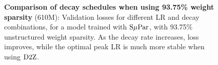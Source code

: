 \begin{figure}
  \centering
  \scalebox{\onefigscale}{
    \texttt{[image: pdffigs/s=0.9375\_curves.617M.pdf]}
  }
  \mbox{}
  \vspace{-4mm}
  \mbox{}
  \caption{\textbf{Comparison of decay schedules when using 93.75\%
      weight sparsity} (610M): Validation losses for different LR and
    decay combinations, for a model trained with $\mbox{S$\mu$Par}$, with
    93.75\% unstructured weight sparsity.  As the decay rate
    increases, loss improves, while the optimal peak LR is much more
    stable when using $\mbox{D2Z}$.\label{fig:maxlr_s=0.9375.curves}}
\end{figure}
